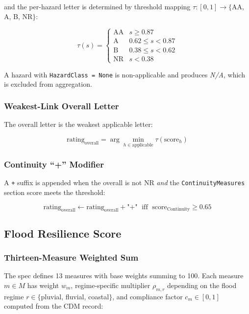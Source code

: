 \documentclass[11pt,a4paper]{article}
\begin{document}
\noindent and the per-hazard letter is determined by threshold mapping
$\tau : [0,1] \to \{$AA, A, B, NR$\}$:

\[
    \tau(s) = \begin{cases}
        \text{AA} & s \geq 0.87 \\
        \text{A}  & 0.62 \leq s < 0.87 \\
        \text{B}  & 0.38 \leq s < 0.62 \\
        \text{NR} & s < 0.38
    \end{cases}
\]

\noindent A hazard with \texttt{HazardClass = None} is non-applicable and produces
\emph{N/A}, which is excluded from aggregation.

\subsubsection{Weakest-Link Overall Letter}
The overall letter is the weakest applicable letter:

\begin{equation}
    \text{rating}_{\text{overall}} = \arg\min_{h \in \text{applicable}} \tau(\text{score}_h)
\end{equation}

\subsubsection{Continuity ``+'' Modifier}
A \texttt{+} suffix is appended when the overall is not NR \emph{and} the
\texttt{ContinuityMeasures} section score meets the threshold:

\[
    \text{rating}_{\text{overall}} \leftarrow \text{rating}_{\text{overall}} + \text{"+"}
    \;\text{ iff }\;
    \text{score}_{\text{Continuity}} \geq 0.65
\]

\subsection{Flood Resilience Score}
\label{sec:flood_spec}

\subsubsection{Thirteen-Measure Weighted Sum}
The spec defines 13 measures with base weights summing to 100. Each measure
$m \in M$ has weight $w_m$, regime-specific multiplier $\rho_{m,r}$ depending on the
flood regime $r \in \{$pluvial, fluvial, coastal$\}$, and compliance factor $c_m
\in [0, 1]$ computed from the CDM record:
\end{document}
